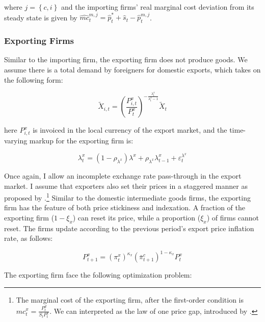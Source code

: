 \documentclass[12pt,oneside,a4paper]{article}
\begin{document}
where $j = \left\{c,i \right\}$ and the importing firms’ real marginal cost deviation from its steady state is given by $\widehat{m c}_{t}^{m, j} = \widehat{p}_t^{*} + \widehat{s}_t - \widehat{p}_t^{m,j} $.
\subsubsection{Exporting Firms}

Similar to the importing firm, the exporting firm does not produce goods. We assume there is a total demand by foreigners for domestic exports, which takes on the
following form:

\begin{equation}
    \tilde{X}_{i, t}=\left(\frac{P_{i, t}^{x}}{P_{t}^{x}}\right)^{-\frac{\lambda_{t}^{x}}{\lambda_{t}^{x}-1}} \tilde{X}_{t}
\end{equation}

here $P_{i,t}^{x}$ is invoiced in the local currency of the export market, and the time-varying markup for the exporting firm is:

\begin{equation}
    \lambda_{t}^{x}=\left(1-\rho_{\lambda^{x}}\right) \lambda^{x}+\rho_{\lambda^{x}} \lambda_{t-1}^{x}+\varepsilon_{t}^{\lambda^{x}}
\end{equation}

Once again, I allow an incomplete exchange rate pass-through in the export market. I assume that exporters also set their prices in a staggered manner as proposed by \citet{Calvo:1983}.\footnote{The marginal cost of the exporting firm, after the first-order condition is $m c_{t}^{x}=\frac{P_{t}^{d}}{S_tP_{t}^{x}}$. We can interpreted as the law of one price gap, introduced by \citet{Monacelli:2005}.} Similar to the domestic intermediate goods firms, the exporting firm has the feature of both price stickiness and indexation. A fraction of the exporting firm ($1-\xi_{x}$) can reset its price, while a proportion ($\xi_{x}$) of firms cannot reset. The firms update according to the previous period’s export price inflation rate, as follows:

\begin{equation}
    P_{t+1}^{x}=\left(\pi_{t}^{x}\right)^{\kappa_{x}}\left(\bar{\pi}_{t+1}^{c}\right)^{1-\kappa_{x}} P_{t}^{x}
\end{equation}

The exporting firm face the following optimization problem:
\end{document}
